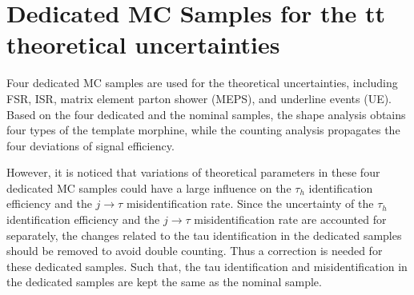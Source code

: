 \section{Dedicated MC Samples for the tt theoretical uncertainties}




Four dedicated MC samples are used for the \ttbar theoretical uncertainties,
including FSR, ISR, matrix element parton shower (MEPS), and underline events (UE).
Based on the four dedicated and the nominal \ttbar samples,
the shape analysis obtains four types of the template morphine,
while the counting analysis propagates the four deviations of signal efficiency.

However, it is noticed that variations of theoretical parameters in these
four dedicated MC samples could have a large influence on the $\tau_h$ identification efficiency
and the $j\to \tau$ misidentification rate. 
Since the uncertainty of the $\tau_h$ identification efficiency and the $j\to \tau$ misidentification rate
are accounted for separately, the changes related to the tau identification 
in the dedicated \ttbar samples should be removed to avoid double counting.
Thus a correction is needed for these dedicated samples.
Such that, the tau identification and misidentification in the dedicated samples 
are kept the same as the nominal \ttbar sample.

